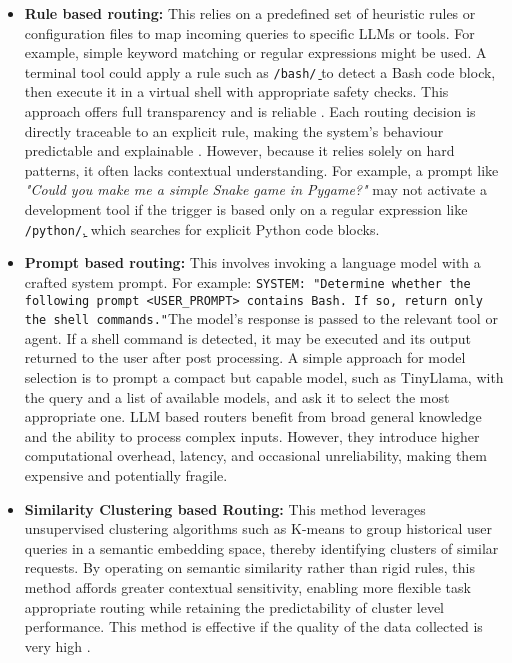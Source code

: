 \begin{itemize}
    \item \textbf{Rule based routing:} This relies on a predefined set of heuristic rules or configuration files to map incoming queries to specific LLMs or tools. For example, simple keyword matching or regular expressions might be used. A terminal tool could apply a rule such as \texttt{/bash\b/} to detect a Bash code block, then execute it in a virtual shell with appropriate safety checks. This approach offers full transparency and is reliable \cite{liveperson-routing-ai-agents}. Each routing decision is directly traceable to an explicit rule, making the system's behaviour predictable and explainable \cite{https://aws.amazon.com/blogs/machine-learning/multi-llm-routing-strategies-for-generative-ai-applications-on-aws/}. However, because it relies solely on hard patterns, it often lacks contextual understanding. For example, a prompt like \textit{"Could you make me a simple Snake game in Pygame?"} may not activate a development tool if the trigger is based only on a regular expression like \texttt{/python\b/}, which searches for explicit Python code blocks.

    \item \textbf{Prompt based routing:} This involves invoking a language model with a crafted system prompt. For example: \texttt{SYSTEM: "Determine whether the following prompt <USER\_PROMPT> contains Bash. If so, return only the shell commands."}\newline The model's response is passed to the relevant tool or agent. If a shell command is detected, it may be executed and its output returned to the user after post processing. A simple approach for model selection is to prompt a compact but capable model, such as TinyLlama, with the query and a list of available models, and ask it to select the most appropriate one. LLM based routers benefit from broad general knowledge and the ability to process complex inputs. However, they introduce higher computational overhead, latency, and occasional unreliability, making them expensive and potentially fragile.

    \item \textbf{Similarity Clustering based Routing:} This method leverages unsupervised clustering algorithms such as K-means to group historical user queries in a semantic embedding space, thereby identifying clusters of similar requests. By operating on semantic similarity rather than rigid rules, this method affords greater contextual sensitivity, enabling more flexible task appropriate routing while retaining the predictability of cluster level performance. This method is effective if the quality of the data collected is very high \cite{varangotreille2025doingimplementingrouting}.


\end{itemize}
